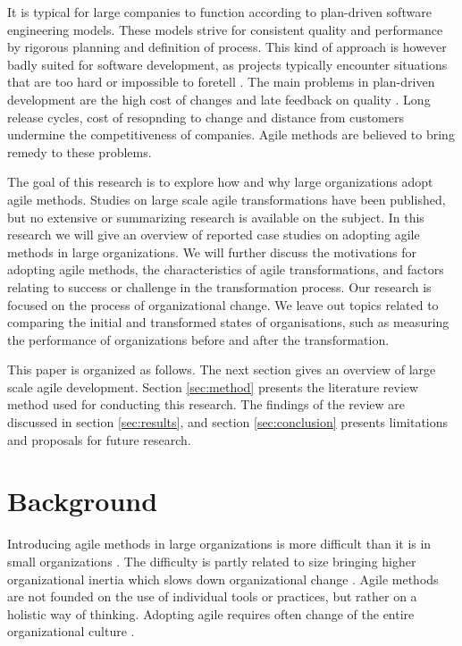 \documentclass[lnbip]{svmultln}
\begin{document}
It is typical for large companies to function according to plan-driven software
engineering models. These models strive for consistent quality and performance
by rigorous planning and definition of process. This kind of approach is however
badly suited for software development, as projects typically encounter
situations that are too hard or impossible to foretell .
The main problems in plan-driven development are the high cost of changes and
late feedback on quality . Long release cycles, cost of
resopnding to change and distance from customers undermine the  competitiveness
of companies. Agile methods are believed to bring remedy to these problems.

The goal of this research is to explore how and why large organizations adopt
agile methods. Studies on large scale agile transformations have been published,
but no extensive or summarizing research is available on the subject. In this
research we will give an overview of reported case studies on adopting agile
methods in large organizations. We will further discuss the motivations for
adopting agile methods, the characteristics of agile transformations, and
factors relating to success or challenge in the transformation process. Our
research is focused on the process of organizational change. We leave out topics
related to comparing the initial and transformed states of organisations, such
as measuring the performance of organizations before and after the
transformation.

This paper is organized as follows. The next section gives an overview of large
scale agile development. Section \ref{sec:method} presents the literature review
method used for conducting this research. The findings of the review are
discussed in section \ref{sec:results}, and section \ref{sec:conclusion}
presents limitations and proposals for future research.


\section{Background}
\label{sec:background}

Introducing agile methods in large organizations is more difficult than it is in
small organizations . The difficulty is partly related to size
bringing higher organizational inertia which slows down organizational change
. Agile methods are not founded on the use of individual
tools or practices, but rather on a holistic way of thinking.
Adopting agile requires often change of the entire organizational culture
.
\end{document}
